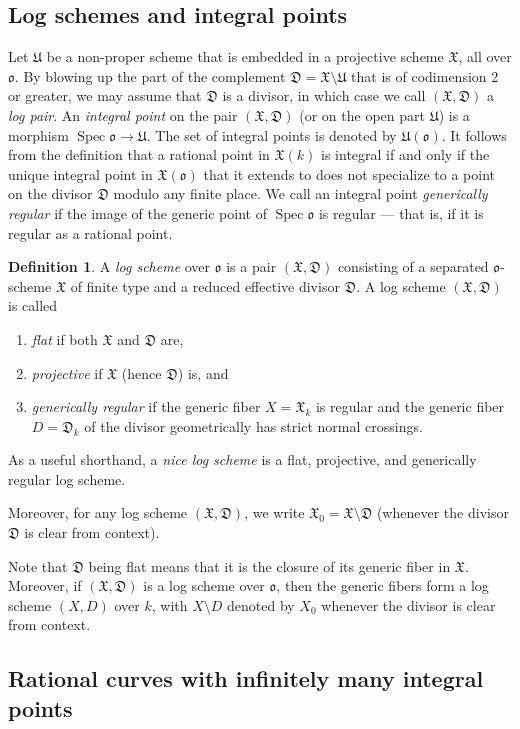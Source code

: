 \documentclass[a4paper, twoside, 11pt]{amsart}
\theoremstyle{definition}
\newtheorem{definition}[theorem]{Definition}
\newcommand{\mD}{\mathfrak{D}}
\newcommand{\mU}{\mathfrak{U}}
\newcommand{\mX}{\mathfrak{X}}
\newcommand{\fo}{\mathfrak{o}}
\DeclareMathOperator{\Spec}{Spec}
\begin{document}
\subsection{Log schemes and integral points}
Let $\mU$ be a non-proper scheme that is embedded in a projective scheme $\mX$, all over $\fo$.
By blowing up the part of  the complement $\mD = \mX\setminus \mU$  that is of codimension 2 or greater, we may assume that $\mD$ is a divisor, in which case we call $(\mX,\mD)$ a \emph{log pair}. 
 An \emph{integral point} on the pair $(\mX,\mD)$ (or on the open part $\mU$) is a morphism $\Spec \fo \to \mU$. The set of integral points is denoted by $\mU(\fo)$. It follows from the definition that a rational point in $\mX(k)$ is integral if and only if the unique integral point in $\mX(\fo)$ that it extends to does not specialize to a point on the divisor $\mD$ modulo any finite place. We call an integral point \emph{generically regular} if the image of the generic point of $\Spec \fo$ is regular --- that is, if it is regular as a rational point.
\begin{definition}
	A \emph{log scheme} over $\fo$ is a pair $(\mX, \mD)$ consisting of a separated $\fo$-scheme $\mX$ of finite type and a reduced effective divisor $\mD$.
	A log scheme $(\mX,\mD)$ is called
	\begin{enumerate}
		\item \emph{flat} if both $\mX$ and $\mD$ are,
		\item \emph{projective} if $\mX$ (hence $\mD$) is, and 
		\item \emph{generically regular} if the generic fiber $X = \mX_k$ is regular and the generic fiber $D = \mD_k$ of the divisor geometrically has strict normal crossings.
	\end{enumerate}
	As a useful shorthand, a \emph{nice log scheme} is a flat, projective, and generically regular log scheme.

	Moreover, for any log scheme $(\mX, \mD)$, we write $\mX_0 = \mX\setminus \mD$ (whenever the divisor $\mD$ is clear from context).
\end{definition}

Note that $\mD$ being flat means that it is the closure of its generic fiber in $\mX$. Moreover, if $(\mX,\mD)$ is a log scheme over $\fo$, then the generic fibers form a log scheme $(X,D)$ over $k$, with $X\setminus D$ denoted by $X_0$ whenever the divisor is clear from context.


\subsection{Rational curves with infinitely many integral points}\label{se:lograttoridal}
\end{document}
